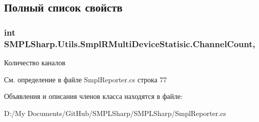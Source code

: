 \subsection{Полный список свойств}
\hypertarget{class_s_m_p_l_sharp_1_1_utils_1_1_smpl_r_multi_device_statisic_a918293b0514cc2084174138c94f3a56c}{
\subsubsection[{Channel\-Count}]{\setlength{\rightskip}{0pt plus 5cm}int S\-M\-P\-L\-Sharp.\-Utils.\-Smpl\-R\-Multi\-Device\-Statisic.\-Channel\-Count\hspace{0.3cm}{\ttfamily [get]}, {\ttfamily [set]}}}\label{de/d2e/class_s_m_p_l_sharp_1_1_utils_1_1_smpl_r_multi_device_statisic_a918293b0514cc2084174138c94f3a56c}


Количество каналов 



См. определение в файле Smpl\-Reporter.\-cs строка 77



Объявления и описания членов класса находятся в файле\-:\begin{DoxyCompactItemize}
\item 
D\-:/\-My Documents/\-Git\-Hub/\-S\-M\-P\-L\-Sharp/\-S\-M\-P\-L\-Sharp/Smpl\-Reporter.\-cs\end{DoxyCompactItemize}

